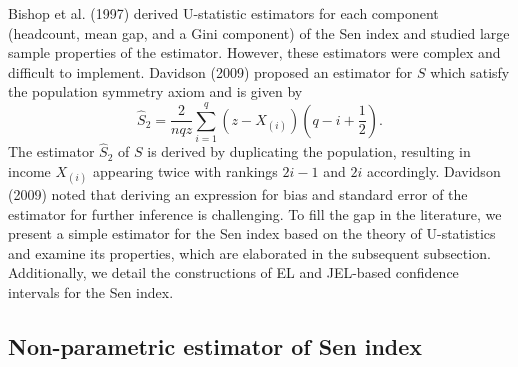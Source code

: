 \documentclass[11pt]{article}
\begin{document}
Bishop et al. (1997) derived U-statistic estimators for each component (headcount, mean gap, and a Gini component) of the Sen index and studied large sample properties of the estimator. However, these estimators were complex and difficult to implement.
Davidson (2009) proposed  an estimator for $S$ which satisfy the population symmetry axiom and is given by
\begin{equation*}\label{sendav}
\widehat{S}_2=\frac{2}{nqz}\sum_{i=1}^{q}(z-X_{(i)})\left(q-i+\frac{1}{2}\right).
\end{equation*}
The estimator $\widehat{S}_2$ of $S$ is derived by duplicating the population, resulting in income $X_{(i)}$ appearing twice with rankings $2i-1$ and $2i$ accordingly. Davidson (2009) noted that deriving an expression for bias and standard error of the estimator for further inference is challenging.
To fill the gap in the literature, we present a simple estimator for the Sen index based on the theory of U-statistics and examine its properties, which are elaborated in the subsequent subsection. Additionally, we detail the constructions of EL and JEL-based confidence intervals for the Sen index.

\subsection{Non-parametric estimator of Sen index}
\end{document}
